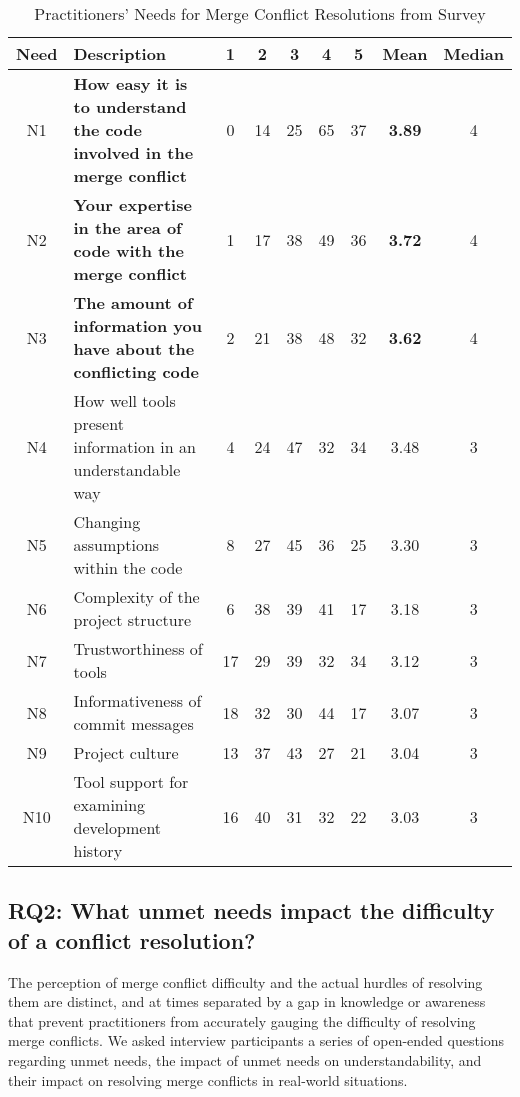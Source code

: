 \begin{table*}[!htbp]
\renewcommand{\arraystretch}{1.3}
\caption{Practitioners' Needs for Merge Conflict Resolutions from Survey}
\label{survey_res_diffs}
\centering
\begin{tabularx}{0.87\textwidth}{c | l | *5{c} | *2{c}}

\toprule
	Need & Description & 1 & 2 & 3 & 4 & 5 & Mean & Median \\
\midrule
	N1 & \textbf{How easy it is to understand the code involved in the merge conflict} & 0 & 14 & 25 & 65 & 37 & \textbf{3.89} & 4 \\
	N2 & \textbf{Your expertise in the area of code with the merge conflict} & 1 & 17 & 38 & 49 & 36 & \textbf{3.72} & 4 \\
	N3 & \textbf{The amount of information you have about the conflicting code} & 2 & 21 & 38 & 48 & 32 & \textbf{3.62} & 4 \\
	N4 & How well tools present information in an understandable way & 4 & 24 & 47 & 32 & 34 & 3.48 & 3 \\
	N5 & Changing assumptions within the code & 8 & 27 & 45 & 36 & 25 & 3.30 & 3 \\
	N6 & Complexity of the project structure & 6 & 38 & 39 & 41 & 17 & 3.18 & 3 \\
	N7 & Trustworthiness of tools & 17 & 29 & 39 & 32 & 34 & 3.12 & 3 \\
	N8 & Informativeness of commit messages & 18 & 32 & 30 & 44 & 17 & 3.07 & 3 \\
	N9 & Project culture & 13 & 37 & 43 & 27 & 21 & 3.04 & 3 \\
	N10 & Tool support for examining development history & 16 & 40 & 31 & 32 & 22 & 3.03 & 3 \\
\bottomrule
\end{tabularx}
\end{table*}

\subsection{\textbf{RQ2:} What unmet needs impact the difficulty of a conflict resolution?}\label{RQ2}

The perception of merge conflict difficulty and the actual hurdles of resolving them are distinct, and at times separated by a gap in knowledge or awareness that prevent practitioners from accurately gauging the difficulty of resolving merge conflicts.
We asked interview participants a series of open-ended questions regarding unmet needs, the impact of unmet needs on understandability, and their impact on resolving merge conflicts in real-world situations.

